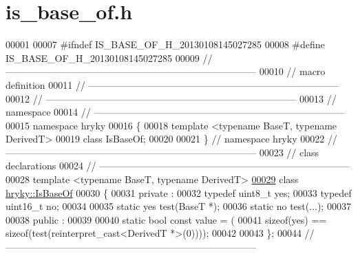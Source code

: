 \hypertarget{is__base__of_8h_source}{\section{is\-\_\-base\-\_\-of.\-h}
}

\begin{DoxyCode}
00001 
00007 \textcolor{preprocessor}{#ifndef IS\_BASE\_OF\_H\_20130108145027285}
00008 \textcolor{preprocessor}{}\textcolor{preprocessor}{#define IS\_BASE\_OF\_H\_20130108145027285}
00009 \textcolor{preprocessor}{}\textcolor{comment}{//
      ------------------------------------------------------------------------------}
00010 \textcolor{comment}{// macro definition}
00011 \textcolor{comment}{//
      ------------------------------------------------------------------------------}
00012 \textcolor{comment}{//
      ------------------------------------------------------------------------------}
00013 \textcolor{comment}{// namespace}
00014 \textcolor{comment}{//
      ------------------------------------------------------------------------------}
00015 \textcolor{keyword}{namespace }hryky
00016 \{
00018     \textcolor{keyword}{template} <\textcolor{keyword}{typename} BaseT, \textcolor{keyword}{typename} DerivedT> 
00019     \textcolor{keyword}{class }IsBaseOf;
00020 
00021 \} \textcolor{comment}{// namespace hryky}
00022 \textcolor{comment}{//
      ------------------------------------------------------------------------------}
00023 \textcolor{comment}{// class declarations}
00024 \textcolor{comment}{//
      ------------------------------------------------------------------------------}
00028 \textcolor{comment}{}\textcolor{keyword}{template} <\textcolor{keyword}{typename} BaseT, \textcolor{keyword}{typename} DerivedT> 
\hypertarget{is__base__of_8h_source_l00029}{}\hyperlink{classhryky_1_1_is_base_of}{00029} \textcolor{keyword}{class }\hyperlink{classhryky_1_1_is_base_of}{hryky::IsBaseOf}
00030 \{
00031 \textcolor{keyword}{private} :
00032     \textcolor{keyword}{typedef} uint8\_t yes;
00033     \textcolor{keyword}{typedef} uint16\_t no;
00034 
00035     \textcolor{keyword}{static} yes test(BaseT *);
00036     \textcolor{keyword}{static} no test(...);
00037     
00038 \textcolor{keyword}{public} :
00039 
00040     \textcolor{keyword}{static} \textcolor{keywordtype}{bool} \textcolor{keyword}{const} value = (
00041         \textcolor{keyword}{sizeof}(yes) == \textcolor{keyword}{sizeof}(test(reinterpret\_cast<DerivedT *>(0))));
00042 
00043 \};
00044 \textcolor{comment}{//
      ------------------------------------------------------------------------------}

\end{DoxyCode}
